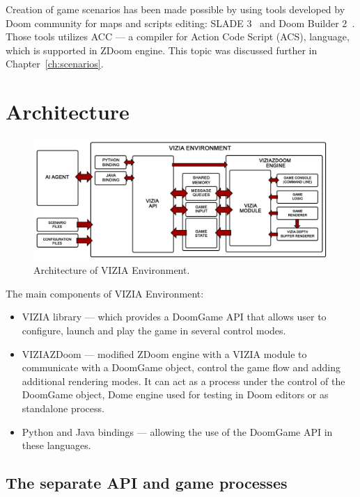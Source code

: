 \documentclass[english,bachelor,a4paper,twoside]{ppfcmthesis}
\begin{document}
Creation of game scenarios has been made possible by using tools developed by Doom community for maps and scripts editing: SLADE 3~\cite{slade3} and Doom Builder 2~\cite{db2}. Those tools utilizes ACC --- a compiler for Action Code Script (ACS), language, which is supported in ZDoom engine.
This topic was discussed further in Chapter~\ref{ch:scenarios}.

\section{Architecture}\label{sec:architecture}
	\begin{figure}
			\centering
			\includegraphics[scale=0.24]{architecture_diagram.png}
			\caption{Architecture of VIZIA Environment.}\label{fig:architecture_diagram}
	\end{figure}

The main components of VIZIA Environment:
    \begin{itemize}
    \item VIZIA library --- which provides a DoomGame API that allows user to configure, launch and play the game in several control modes.
    \item VIZIAZDoom --- modified ZDoom engine with a VIZIA module to communicate with a DoomGame object, control the game flow and adding additional rendering modes. It can act as a process under the control of the DoomGame object, Dome engine used for testing in Doom editors or as standalone process.
    \item Python and Java bindings --- allowing the use of the DoomGame API in these languages.
    \end{itemize}


\subsection{The separate API and game processes}\label{sec:architecture_separate_processes}
\end{document}
